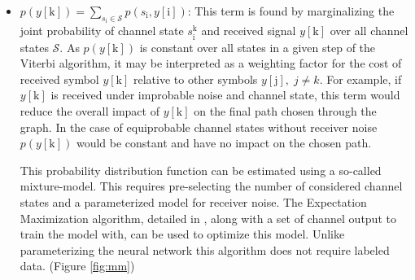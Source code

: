 \documentclass[12pt,a4paper]{report}
\begin{document}
\begin{itemize}
\item $p(y[\mathrm{k}]) = \sum_{s_{\mathrm{i}} \in \textit{$\mathcal{S}$}}p(s_{\mathrm{i}},y[\mathrm{i}])$: This term is found by marginalizing the joint probability of channel state $s_{\mathrm{i}}^{\mathrm{k}}$ and received signal $y[\mathrm{k}]$ over all channel states $\mathcal{S}$. As $p(y[\mathrm{k}])$ is constant over all states in a given step of the Viterbi algorithm, it may be interpreted as a weighting factor for the cost of received symbol $y[\mathrm{k}]$ relative to other symbols $y[\mathrm{j}], \; j\neq k$. For example, if $y[\mathrm{k}]$ is received under improbable noise and channel state, this term would reduce the overall impact of $y[\mathrm{k}]$ on the final path chosen through the graph. In the case of equiprobable channel states without receiver noise $p(y[\mathrm{k}])$ would be constant and have no impact on the chosen path.
\par
This probability distribution function can be estimated using a so-called mixture-model. This requires pre-selecting the number of considered channel states and a parameterized model for receiver noise. The Expectation Maximization algorithm, detailed in \cite{ng2000cs229}, along with a set of channel output to train the model with, can be used to optimize this model. Unlike parameterizing the neural network this algorithm does not require labeled data. 
 (Figure \ref{fig:mm})
%
%



\end{itemize}
\end{document}
